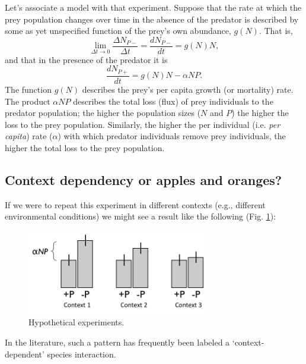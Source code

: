 \documentclass[10pt,letterpaper]{article}
\begin{document}
Let's associate a model with that experiment.  Suppose that the rate at which the prey population changes over time in the absence of the predator is described by some as yet unspecified function of the prey's own abundance, $g(N)$.  That is,
\begin{equation}
	\lim_{\Delta t \to 0}\frac{\Delta N_{P-}}{\Delta t}=\frac{dN_{P-}}{dt}= g(N)N,
\end{equation}
and that in the presence of the predator it is
\begin{equation}
	\frac{d N_{P+}}{d t} = g(N) N - \alpha N P.
\end{equation}
The function $g(N)$ describes the prey's per capita growth (or mortality) rate.  The product $\alpha N P$ describes the total loss (flux) of prey individuals to the predator population; the higher the population sizes ($N$ and $P$) the higher the loss to the prey population.  Similarly, the higher the per individual (i.e. \emph{per capita}) rate ($\alpha$) with which predator individuals remove  prey individuals, the higher the total loss to the prey population. 


\subsection{Context dependency or apples and oranges?}
If we were to repeat this experiment in different contexts (e.g., different environmental conditions) we might see a result like the following (Fig. \ref{fig:ExpmtTrtms}):

\begin{figure}[ht!]
\centering
\includegraphics[width=80mm]{figs/Fig1.png}
	\caption{Hypothetical experiments.}
	\label{fig:ExpmtTrtms}
\end{figure}
\noindent
In the literature, such a pattern has frequently been labeled a `context-dependent' species interaction.
\end{document}
